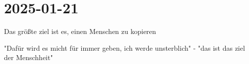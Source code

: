 \section{2025-01-21}


\startitemize[packed]
\item Das größte ziel ist es, einen Menschen zu kopieren
\item "Dafür wird es micht für immer geben, ich werde unsterblich" - "das ist das ziel der Menschheit"
\stopitemize
